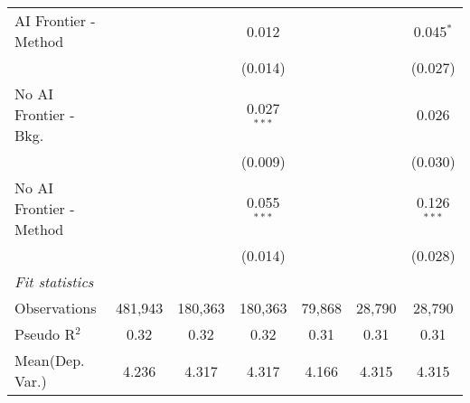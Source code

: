 \begin{tabular}{lcccccc}
   AI Frontier - Method    &               &               & 0.012         &               &               & 0.045$^{*}$\\   
                           &               &               & (0.014)       &               &               & (0.027)\\   
   No AI Frontier - Bkg.   &               &               & 0.027$^{***}$ &               &               & 0.026\\   
                           &               &               & (0.009)       &               &               & (0.030)\\   
   No AI Frontier - Method &               &               & 0.055$^{***}$ &               &               & 0.126$^{***}$\\   
                           &               &               & (0.014)       &               &               & (0.028)\\   
   \midrule
   \emph{Fit statistics}\\
   Observations            & 481,943       & 180,363       & 180,363       & 79,868        & 28,790        & 28,790\\  
   Pseudo R$^2$            & 0.32          & 0.32          & 0.32          & 0.31          & 0.31          & 0.31\\  
Mean(Dep. Var.) & 4.236 & 4.317 & 4.317 & 4.166 & 4.315 & 4.315 \\
   

\end{tabular}
